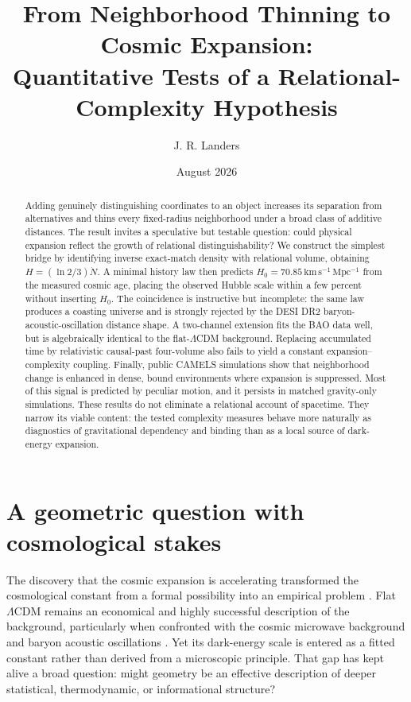 \documentclass[10pt,twocolumn]{article}
\title{\vspace{-2.0em}\textbf{From Neighborhood Thinning to Cosmic Expansion:\\Quantitative Tests of a Relational-Complexity Hypothesis}}
\author{J. R. Landers}
\date{August 2026}
\newcommand{\LCDM}{$\Lambda$CDM}
\newcommand{\kmsmpc}{\mathrm{km\,s^{-1}\,Mpc^{-1}}}
\begin{document}
\maketitle
\vspace{-1.2em}

\begin{abstract}
Adding genuinely distinguishing coordinates to an object increases its
separation from alternatives and thins every fixed-radius neighborhood under a
broad class of additive distances.  The result invites a speculative but
testable question: could physical expansion reflect the growth of relational
distinguishability?  We construct the simplest bridge by identifying inverse
exact-match density with relational volume, obtaining
$H=(\ln 2/3)\dot N$.  A minimal history law then predicts
$H_0=70.85\,\kmsmpc$ from the measured cosmic age, placing the observed Hubble
scale within a few percent without inserting $H_0$.  The coincidence is
instructive but incomplete: the same law produces a coasting universe and is
strongly rejected by the DESI DR2 baryon-acoustic-oscillation distance shape.
A two-channel extension fits the BAO data well, but is algebraically identical
to the flat-\LCDM{} background.  Replacing accumulated time by relativistic
causal-past four-volume also fails to yield a constant expansion--complexity
coupling.  Finally, public CAMELS simulations show that neighborhood change is
enhanced in dense, bound environments where expansion is suppressed.  Most of
this signal is predicted by peculiar motion, and it persists in matched
gravity-only simulations.  These results do not eliminate a relational account
of spacetime.  They narrow its viable content: the tested complexity measures
behave more naturally as diagnostics of gravitational dependency and binding
than as a local source of dark-energy expansion.
\end{abstract}

\section{A geometric question with cosmological stakes}

The discovery that the cosmic expansion is accelerating transformed the
cosmological constant from a formal possibility into an empirical problem
\citep{Riess1998,Perlmutter1999}.  Flat \LCDM{} remains an economical and highly
successful description of the background, particularly when confronted with
the cosmic microwave background and baryon acoustic oscillations
\citep{Planck2018,DESI2025}.  Yet its dark-energy scale is entered as a fitted
constant rather than derived from a microscopic principle.  That gap has kept
alive a broad question: might geometry be an effective description of deeper
statistical, thermodynamic, or informational structure?
\end{document}
